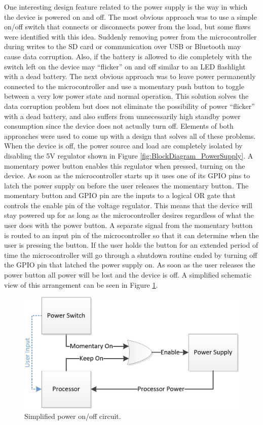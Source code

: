 One interesting design feature related to the power supply is the way in which 
the device is powered on and off. The most obvious approach was to use a simple 
on/off switch that connects or disconnects power from the load, but some flaws 
were identified with this idea. Suddenly removing power from the microcontroller 
during writes to the SD card or communication over USB or Bluetooth may cause 
data corruption. Also, if the battery is allowed to die completely with the 
switch left on the device may “flicker” on and off similar to an LED flashlight 
with a dead battery. The next obvious approach was to leave power permanently 
connected to the microcontroller and use a momentary push button to toggle 
between a very low power state and normal operation. This solution solves the 
data corruption problem but does not eliminate the possibility of power 
“flicker” with a dead battery, and also suffers from unnecessarily high standby 
power consumption since the device does not actually turn off. Elements of both 
approaches were used to come up with a design that solves all of these problems. 
When the device is off, the power source and load are completely isolated by 
disabling the 5V regulator shown in Figure \ref{fig:BlockDiagram_PowerSupply}. 
A momentary power button enables this regulator when pressed, turning on the 
device. As soon as the microcontroller starts up it uses one of its GPIO pins to 
latch the power supply on before the user releases the momentary button. The 
momentary button and GPIO pin are the inputs to a logical OR gate that controls 
the enable pin of the voltage regulator. This means that the device will stay 
powered up for as long as the microcontroller desires regardless of what the 
user does with the power button. A separate signal from the momentary button is 
routed to an input pin of the microcontroller so that it can determine when the 
user is pressing the button. If the user holds the button for an extended period 
of time the microcontroller will go through a shutdown routine ended by turning 
off the GPIO pin that latched the power supply on. As soon as the user releases 
the power button all power will be lost and the device is off. A simplified 
schematic view of this arrangement can be seen in 
Figure \ref{fig:BlockDiagram_OnOff}.

\begin{figure}[!htb]
\centering
\includegraphics[scale=0.35]{images/BlockDiagram_OnOff.png}
\caption{Simplified power on/off circuit.}
\label{fig:BlockDiagram_OnOff}
\end{figure}

